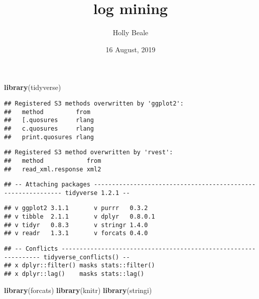 \documentclass[]{article}
\title{log mining}
\author{Holly Beale}
\date{16 August, 2019}
\newenvironment{Shaded}{\begin{snugshade}}{\end{snugshade}}
\newcommand{\KeywordTok}[1]{\textcolor[rgb]{0.13,0.29,0.53}{\textbf{#1}}}
\newcommand{\NormalTok}[1]{#1}
\begin{document}
\maketitle

\begin{Shaded}
\begin{Highlighting}[]
\KeywordTok{library}\NormalTok{(tidyverse)}
\end{Highlighting}
\end{Shaded}

\begin{verbatim}
## Registered S3 methods overwritten by 'ggplot2':
##   method         from 
##   [.quosures     rlang
##   c.quosures     rlang
##   print.quosures rlang
\end{verbatim}

\begin{verbatim}
## Registered S3 method overwritten by 'rvest':
##   method            from
##   read_xml.response xml2
\end{verbatim}

\begin{verbatim}
## -- Attaching packages ------------------------------------------------------------- tidyverse 1.2.1 --
\end{verbatim}

\begin{verbatim}
## v ggplot2 3.1.1       v purrr   0.3.2  
## v tibble  2.1.1       v dplyr   0.8.0.1
## v tidyr   0.8.3       v stringr 1.4.0  
## v readr   1.3.1       v forcats 0.4.0
\end{verbatim}

\begin{verbatim}
## -- Conflicts ---------------------------------------------------------------- tidyverse_conflicts() --
## x dplyr::filter() masks stats::filter()
## x dplyr::lag()    masks stats::lag()
\end{verbatim}

\begin{Shaded}
\begin{Highlighting}[]
\KeywordTok{library}\NormalTok{(forcats)}
\KeywordTok{library}\NormalTok{(knitr)}
\KeywordTok{library}\NormalTok{(stringi)}
\end{Highlighting}
\end{Shaded}

\hypertarget{section}{%
\section{}\label{section}}
\end{document}
